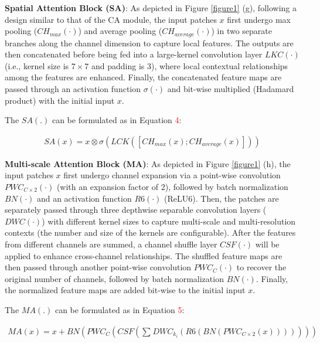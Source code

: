 \documentclass[10pt, a4paper, twocolumn]{article}
\begin{document}
\textbf{Spatial Attention Block (SA)}\cite{woo2018cbam}: As depicted in Figure \textcolor{red}{\ref{figure1}} (g), following a design similar to that of the CA module, the input patches $x$ first undergo max pooling ($CH_{max}(\cdot)$) and average pooling ($CH_{average}(\cdot)$) in two separate branches along the channel dimension to capture local features. The outputs are then concatenated before being fed into a large-kernel convolution layer $LKC(\cdot)$ (i.e., kernel size is $7\times7$ and padding is 3), where local contextual relationships among the features are enhanced. Finally, the concatenated feature maps are passed through an activation function $\sigma(\cdot)$ and bit-wise multiplied (Hadamard product) with the initial input $x$.

The $SA(.)$ can be formulated as in Equation \textcolor{red}{4}:
\begin{scriptsize}   
\begin{align}
  SA(x) = x \otimes \sigma(LCK([CH_{max}(x); CH_{average}(x)]))
\end{align}
\end{scriptsize}

\textbf{Multi-scale Attention Block (MA)}: As depicted in Figure \textcolor{red}{\ref{figure1}} (h), the input patches $x$ first undergo channel expansion via a point-wise convolution $PWC_{C\times 2}(\cdot)$ (with an expansion factor of 2), followed by batch normalization $BN(\cdot)$ and an activation function $R6(\cdot)$ (ReLU6\cite{howard2017mobilenets}). Then, the patches are separately passed through three depthwise separable convolution layers ($DWC(\cdot)$) with different kernel sizes to capture multi-scale and multi-resolution contexts (the number and size of the kernels are configurable). After the features from different channels are summed, a channel shuffle layer\cite{zhang2018shufflenet} $CSF(\cdot)$ will be applied to enhance cross-channel relationships. The shuffled feature maps are then passed through another point-wise convolution $PWC_C(\cdot)$ to recover the original number of channels, followed by batch normalization $BN(\cdot)$. Finally, the normalized feature maps are added bit-wise to the initial input $x$.

The $MA(.)$ can be formulated as in Equation \textcolor{red}{5}:
\begin{scriptsize}   
\begin{align}
  MA(x)=x+BN(PWC_{C}(CSF(\sum_{}^{}DWC_{k_i}(R6(BN(PWC_{C\times2}(x)))))))
\end{align}
\end{scriptsize}
\end{document}
